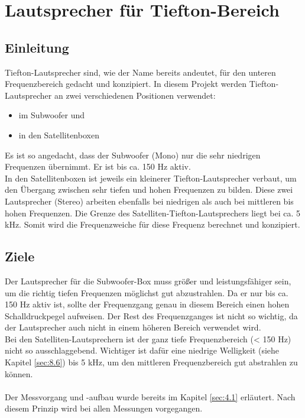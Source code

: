 
\section{Lautsprecher für Tiefton-Bereich} \label{sec:4.2}
\subsection*{Einleitung} \label{subsec:4.2.1}
Tiefton-Lautsprecher sind, wie der Name bereits andeutet, für den unteren Frequenzbereich gedacht und konzipiert.
In diesem Projekt werden Tiefton-Lautsprecher an zwei verschiedenen Positionen verwendet:
\begin{itemize}
	\item im Subwoofer und 
	\item in den Satellitenboxen
\end{itemize}
Es ist so angedacht, dass der Subwoofer (Mono) nur die sehr niedrigen Frequenzen übernimmt.
Er ist bis ca. 150 Hz aktiv.\\
In den Satellitenboxen ist jeweils ein kleinerer Tiefton-Lautsprecher verbaut, um den Übergang zwischen sehr tiefen und hohen Frequenzen zu bilden.
Diese zwei Lautsprecher (Stereo) arbeiten ebenfalls bei niedrigen als auch bei mittleren bis hohen Frequenzen.
Die Grenze des Satelliten-Tiefton-Lautsprechers liegt bei ca. 5 kHz.
Somit wird die Frequenzweiche für diese Frequenz berechnet und konzipiert.

\subsection*{Ziele} \label{subsec:4.2.2}
Der Lautsprecher für die Subwoofer-Box muss größer und leistungsfähiger sein, um die richtig tiefen Frequenzen möglichst gut abzustrahlen.
Da er nur bis ca. 150 Hz aktiv ist, sollte der Frequenzgang genau in diesem Bereich einen hohen Schalldruckpegel aufweisen.
Der Rest des Frequenzganges ist nicht so wichtig, da der Lautsprecher auch nicht in einem höheren Bereich verwendet wird. \\
Bei den Satelliten-Lautsprechern ist der ganz tiefe Frequenzbereich (< 150 Hz) nicht so ausschlaggebend.
Wichtiger ist dafür eine niedrige Welligkeit (siehe Kapitel \ref{sec:8.6}) bis 5 kHz, um den mittleren Frequenzbereich gut abstrahlen zu können.\\ \\
Der Messvorgang und -aufbau wurde bereits im Kapitel \ref{sec:4.1} erläutert.
Nach diesem Prinzip wird bei allen Messungen vorgegangen.

